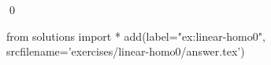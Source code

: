 
\begin{ex} 
  \label{ex:linear-homo0}
  
  \qed
\end{ex} 
\begin{python0}
from solutions import *
add(label="ex:linear-homo0",
    srcfilename='exercises/linear-homo0/answer.tex') 
\end{python0}
